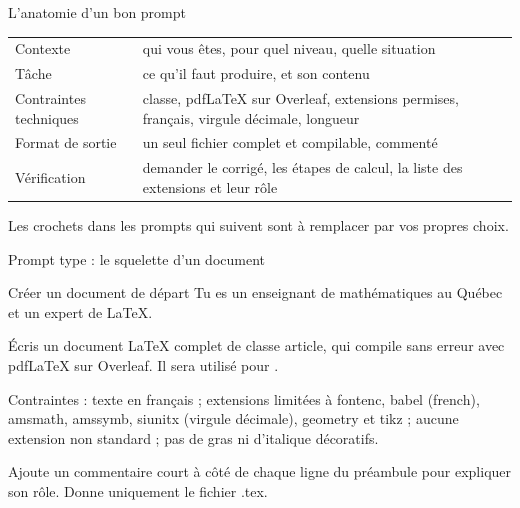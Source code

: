 \begin{frame}{L'anatomie d'un bon prompt}
  \small
  \begin{center}
  \begin{tabular}{lp{9.5cm}}
    \toprule
    Contexte & qui vous êtes, pour quel niveau, quelle situation \\
    Tâche & ce qu'il faut produire, et son contenu \\
    Contraintes techniques & classe, pdfLaTeX sur Overleaf, extensions
      permises, français, virgule décimale, longueur \\
    Format de sortie & un seul fichier complet et compilable, commenté \\
    Vérification & demander le corrigé, les étapes de calcul, la liste
      des extensions et leur rôle \\
    \bottomrule
  \end{tabular}
  \end{center}
  \vspace{4pt}
  Les crochets  dans les prompts qui suivent sont à
  remplacer par vos propres choix.
\end{frame}

\begin{frame}{Prompt type : le squelette d'un document}
  \begin{Prompt}{Créer un document de départ}
    Tu es un enseignant de mathématiques  au Québec et un expert de LaTeX.

    Écris un document LaTeX complet de classe article, qui compile sans
    erreur avec pdfLaTeX sur Overleaf. Il sera utilisé pour
     .

    Contraintes : texte en français ; extensions limitées à fontenc,
    babel (french), amsmath, amssymb, siunitx (virgule décimale), geometry
    et tikz ; aucune extension non standard ; pas de gras ni d'italique
    décoratifs.

    Ajoute un commentaire court à côté de chaque ligne du préambule pour
    expliquer son rôle. Donne uniquement le fichier .tex.
  \end{Prompt}
\end{frame}

